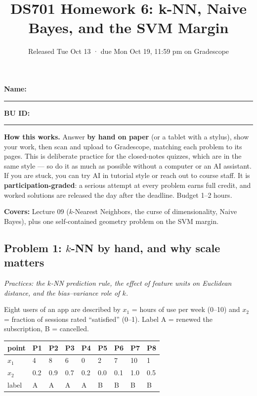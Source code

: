 \documentclass[
  11pt,
]{article}
\title{DS701 Homework 6: k-NN, Naive Bayes, and the SVM Margin}
\subtitle{Released Tue Oct 13 · due Mon Oct 19, 11:59 pm on Gradescope}
\author{}
\date{}
\newcounter{none} %
\begin{document}
\maketitle


\noindent\textbf{Name:}\ \rule{2.0in}{0.4pt}\qquad\textbf{BU ID:}\ \rule{1.2in}{0.4pt}
\vspace{6pt}

\textbf{How this works.} Answer \textbf{by hand on paper} (or a tablet
with a stylus), show your work, then scan and upload to Gradescope,
matching each problem to its pages. This is deliberate practice for the
closed-notes quizzes, which are in the same style --- so do it as much
as possible without a computer or an AI assistant. If you are stuck, you
can try AI in tutorial style or reach out to course staff. It is
\textbf{participation-graded}: a serious attempt at every problem earns
full credit, and worked solutions are released the day after the
deadline. Budget 1--2 hours.

\textbf{Covers:} Lecture 09 (\(k\)-Nearest Neighbors, the curse of
dimensionality, Naive Bayes), plus one self-contained geometry problem
on the SVM margin.

\subsection{\texorpdfstring{Problem 1: \(k\)-NN by hand, and why scale
matters}{Problem 1: k-NN by hand, and why scale matters}}\label{problem-1-k-nn-by-hand-and-why-scale-matters}

\emph{Practices: the \(k\)-NN prediction rule, the effect of feature
units on Euclidean distance, and the bias--variance role of \(k\).}

Eight users of an app are described by \(x_1\) = hours of use per week
(0--10) and \(x_2\) = fraction of sessions rated ``satisfied'' (0--1).
Label A = renewed the subscription, B = cancelled.

{\def\LTcaptype{none} %
\begin{longtable}[]{@{}lllllllll@{}}
\toprule\noalign{}
point & P1 & P2 & P3 & P4 & P5 & P6 & P7 & P8 \\
\midrule\noalign{}
\endhead
\bottomrule\noalign{}
\endlastfoot
\(x_1\) & 4 & 8 & 6 & 0 & 2 & 7 & 10 & 1 \\
\(x_2\) & 0.2 & 0.9 & 0.7 & 0.2 & 0.0 & 0.1 & 1.0 & 0.5 \\
label & A & A & A & A & B & B & B & B \\
\end{longtable}
}
\end{document}
